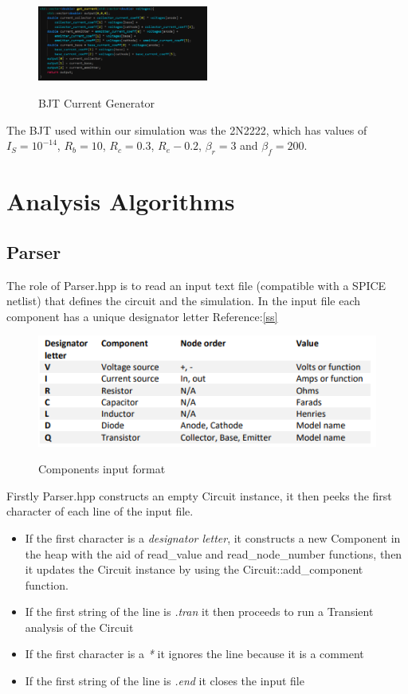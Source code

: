 \documentclass{article}
\begin{document}
\begin{figure}[h]
    \caption{BJT Current Generator}
    \centering
    \includegraphics[width=0.5\textwidth]{images/BJTCurrent.png}
    \label{fig:BJTCurrent}
\end{figure}
The BJT used within our simulation was the 2N2222, which has values of $I_S = 10^{-14}$, $R_b = 10$, $R_c = 0.3$, $R_e - 0.2$, $\beta_r = 3$ and $\beta_f = 200$.
\newpage

\section{Analysis Algorithms}\label{sec:AnalysisAlgorithms}
\subsection{Parser}\label{ssec:parser}
The role of Parser.hpp is to read an input text file (compatible with a SPICE netlist) that defines the circuit and the simulation.\medbreak
In the input file each component has a unique designator letter \bigbreak
Reference:\ref{ss}
\begin{figure}[h]
    \caption{Components input format}
    \centering
    \includegraphics[width=1\textwidth]{images/components_input_format.PNG}
    \label{fig:ComponentsInputFormat}
\end{figure}
Firstly Parser.hpp constructs an empty Circuit instance, it then peeks the first character of each line of the input file.
\begin{itemize}
\item If the first character is a \textit{designator letter}, it constructs a new Component in the heap with the aid of read\_value and read\_node\_number functions, then it updates the Circuit instance by using the Circuit::add\_component function.
\item If the first string of the line is \textit{.tran} it then proceeds to run a Transient analysis of the Circuit
\item If the first character is a \textit{*} it ignores the line because it is a comment
\item If the first string of the line is \textit{.end} it closes the input file
\end{itemize}
\end{document}
